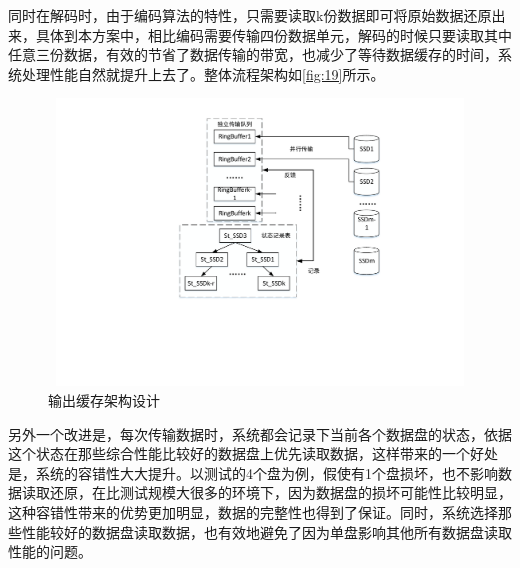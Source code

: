 同时在解码时，由于编码算法的特性，只需要读取k份数据即可将原始数据还原出来，具体到本方案中，相比编码需要传输四份数据单元，解码的时候只要读取其中任意三份数据，有效的节省了数据传输的带宽，也减少了等待数据缓存的时间，系统处理性能自然就提升上去了。整体流程架构如\autoref{fig:19}所示。
\begin{figure}
	\centering
	\includegraphics[width=4.8in,height=3in]{Pics/parallel-read.pdf}
	\caption{输出缓存架构设计}
	\label{fig:19}
\end{figure}
另外一个改进是，每次传输数据时，系统都会记录下当前各个数据盘的状态，依据这个状态在那些综合性能比较好的数据盘上优先读取数据，这样带来的一个好处是，系统的容错性大大提升。以测试的4个盘为例，假使有1个盘损坏，也不影响数据读取还原，在比测试规模大很多的环境下，因为数据盘的损坏可能性比较明显，这种容错性带来的优势更加明显，数据的完整性也得到了保证。同时，系统选择那些性能较好的数据盘读取数据，也有效地避免了因为单盘影响其他所有数据盘读取性能的问题。
